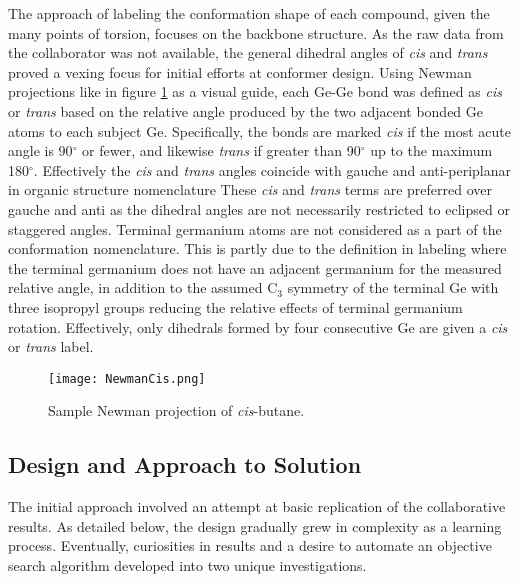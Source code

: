 The approach of labeling the conformation shape of each compound, given the many points of torsion, focuses on the backbone structure. 
As the raw data from the collaborator was not available, the general dihedral angles of \textit{cis} and \textit{trans} proved a vexing focus for initial efforts at conformer design.
Using Newman projections like in figure \ref{fig:Newman} as a visual guide, each Ge-Ge bond was defined as \textit{cis} or \textit{trans} based on the relative angle produced by the two adjacent bonded Ge atoms to each subject Ge.
Specifically, the bonds are marked \textit{cis} if the most acute angle is 90$^{\circ}$ or fewer, and likewise \textit{trans} if greater than 90$^{\circ}$ up to the maximum 180$^{\circ}$.
Effectively the \textit{cis} and \textit{trans} angles coincide with gauche and anti-periplanar in organic structure nomenclature %
These \textit{cis} and \textit{trans} terms are preferred over gauche and anti as the dihedral angles are not necessarily restricted to eclipsed or staggered angles.
Terminal germanium atoms are not considered as a part of the conformation nomenclature. 
This is partly due to the definition in labeling where the terminal germanium does not have an adjacent germanium for the measured relative angle, in addition to the assumed 
C$_{3}$
symmetry of the terminal Ge with three isopropyl groups reducing the relative effects of terminal germanium rotation.
Effectively, only dihedrals formed by four consecutive Ge are given a \textit{cis} or \textit{trans} label.

\begin{figure}
	
	\centering
	
	\texttt{[image: NewmanCis.png]}
	
	\caption{Sample Newman projection of \textit{cis}-butane.}
	
	\label{fig:Newman}
	
\end{figure}

\subsection{Design and Approach to Solution}

The initial approach involved an attempt at basic replication of the collaborative results.
As detailed below, the design gradually grew in complexity as a learning process. 
Eventually, curiosities in results and a desire to automate an objective search algorithm developed into two unique investigations.

